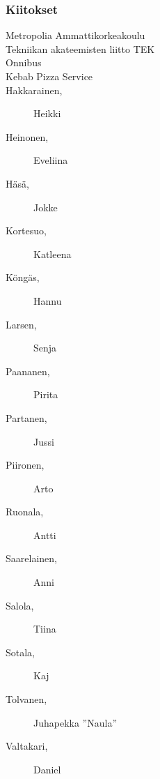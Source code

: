 \subsubsection*{Kiitokset}
\begin{multicols}{2}
\begin{description}
\item[Metropolia Ammattikorkeakoulu] %
\item[Tekniikan akateemisten liitto TEK]
\item[Onnibus]
\item[Kebab Pizza Service]
\item[Hakkarainen, ] Heikki
\item[Heinonen, ] Eveliina
\item[Häsä, ] Jokke
\item[Kortesuo, ] Katleena
\item[Köngäs, ] Hannu
\item[Larsen, ] Senja
\item[Paananen, ] Pirita %
\item[Partanen, ] Jussi
\item[Piironen, ] Arto
\item[Ruonala, ] Antti
\item[Saarelainen, ] Anni
\item[Salola, ] Tiina
\item[Sotala, ] Kaj
\item[Tolvanen, ] Juhapekka ''Naula''
\item[Valtakari, ] Daniel
\end{description}
\end{multicols}
